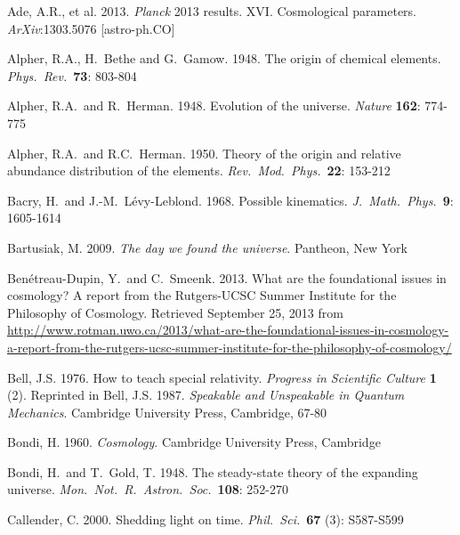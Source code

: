 \documentclass[12 pt]{article}
\begin{document}
\begin{thebibliography}{}

 Ade, A.R., et al. 2013. \textit{Planck} 2013 results. XVI. Cosmological parameters. \textit{ArXiv}:1303.5076 [astro-ph.CO]

 Alpher, R.A., H.\ Bethe and G.\ Gamow. 1948. The origin of chemical elements. \textit{Phys.\ Rev.}\ \textbf{73}: 803-804

 Alpher, R.A.\ and R.\ Herman. 1948. Evolution of the universe. \textit{Nature} \textbf{162}: 774-775

 Alpher, R.A.\ and R.C.\ Herman. 1950. Theory of the origin and relative abundance distribution of the elements. \textit{Rev.\ Mod.\ Phys.}\ \textbf{22}: 153-212

 Bacry, H.\ and J.-M.\ L\'{e}vy-Leblond. 1968. Possible kinematics. \textit{J.\ Math.\ Phys.}\ \textbf{9}: 1605-1614

 Bartusiak, M. 2009. \textit{The day we found the universe}. Pantheon, New York

 Ben\'{e}treau-Dupin, Y.\ and C.\ Smeenk. 2013. What are the foundational issues in cosmology? A report from the Rutgers-UCSC Summer Institute for the Philosophy of Cosmology. Retrieved September 25, 2013 from \url{http://www.rotman.uwo.ca/2013/what-are-the-foundational-issues-in-cosmology-a-report-from-the-rutgers-ucsc-summer-institute-for-the-philosophy-of-cosmology/}

 Bell, J.S. 1976. How to teach special relativity. \textit{Progress in Scientific Culture} \textbf{1} (2). Reprinted in Bell, J.S. 1987. \textit{Speakable and Unspeakable in Quantum Mechanics}. Cambridge University Press, Cambridge, 67-80

 Bondi, H. 1960. \textit{Cosmology}. Cambridge University Press, Cambridge

 Bondi, H.\ and T.\ Gold, T. 1948. The steady-state theory of the expanding universe. \textit{Mon.\ Not.\ R.\ Astron.\ Soc.}\ \textbf{108}: 252-270

 Callender, C. 2000. Shedding light on time. \textit{Phil.\ Sci.}\ \textbf{67} (3): S587-S599


\end{thebibliography}
\end{document}
